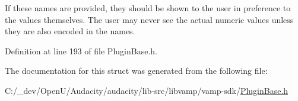 If these names are provided, they should be shown to the user in preference to the values themselves. The user may never see the actual numeric values unless they are also encoded in the names. 

Definition at line 193 of file Plugin\+Base.\+h.



The documentation for this struct was generated from the following file\+:\begin{DoxyCompactItemize}
\item 
C\+:/\+\_\+dev/\+Open\+U/\+Audacity/audacity/lib-\/src/libvamp/vamp-\/sdk/\hyperlink{vamp-sdk_2_plugin_base_8h}{Plugin\+Base.\+h}\end{DoxyCompactItemize}
